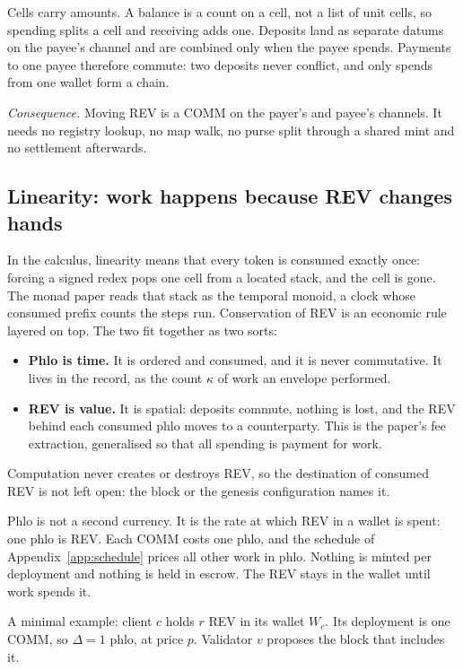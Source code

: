 \documentclass[11pt]{article}
\newcommand{\code}{\path}
\begin{document}
Cells carry amounts. A balance is a count on a cell, not a list of unit cells, so spending splits a cell and receiving adds one. Deposits land as separate datums on the payee's channel and are combined only when the payee spends. Payments to one payee therefore commute: two deposits never conflict, and only spends from one wallet form a chain.

\emph{Consequence.} Moving REV is a COMM on the payer's and payee's channels. It needs no registry lookup, no map walk, no purse split through a shared mint and no settlement afterwards.

\subsection{Linearity: work happens because REV changes hands}\label{sec:linear}

In the calculus, linearity means that every token is consumed exactly once: forcing a signed redex pops one cell from a located stack, and the cell is gone. The monad paper reads that stack as the temporal monoid, a clock whose consumed prefix counts the steps run. Conservation of REV is an economic rule layered on top. The two fit together as two sorts:
\begin{itemize}
\item \textbf{Phlo is time.} It is ordered and consumed, and it is never commutative. It lives in the record, as the count $\kappa$ of work an envelope performed.
\item \textbf{REV is value.} It is spatial: deposits commute, nothing is lost, and the REV behind each consumed phlo moves to a counterparty. This is the paper's fee extraction, generalised so that all spending is payment for work.
\end{itemize}
Computation never creates or destroys REV, so the destination of consumed REV is not left open: the block or the genesis configuration names it.

Phlo is not a second currency. It is the rate at which REV in a wallet is spent: one phlo is \code{phloPrice} REV. Each COMM costs one phlo, and the schedule of Appendix~\ref{app:schedule} prices all other work in phlo. Nothing is minted per deployment and nothing is held in escrow. The REV stays in the wallet until work spends it.

A minimal example: client $c$ holds $r$ REV in its wallet $W_c$. Its deployment is one COMM, so $\Delta = 1$ phlo, at price $p$. Validator $v$ proposes the block that includes it.
\end{document}
